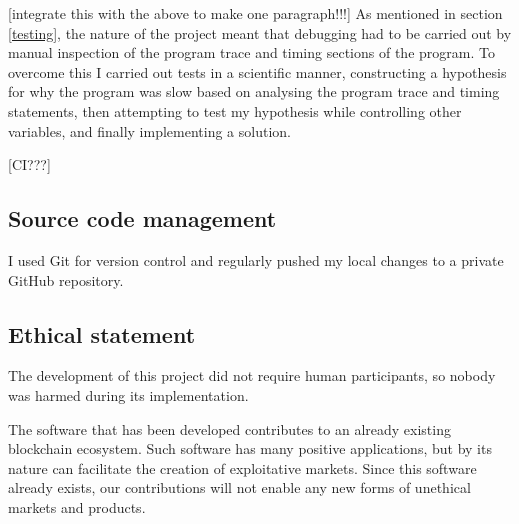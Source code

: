 [integrate this with the above to make one paragraph!!!]
As mentioned in section \ref{testing}, the nature of the project meant that debugging had to be carried out by manual inspection of the program trace and timing sections of the program. To overcome this I carried out tests in a scientific manner, constructing a hypothesis for why the program was slow based on analysing the program trace and timing statements, then attempting to test my hypothesis while controlling other variables, and finally implementing a solution.

[CI???]

\subsection{Source code management}

I used Git for version control and regularly pushed my local changes to a private GitHub repository.

\subsection{Ethical statement}
The development of this project did not require human participants, so nobody was harmed during its implementation.

The software that has been developed contributes to an already existing blockchain ecosystem. Such software has many positive applications, but by its nature can facilitate the creation of exploitative markets. Since this software already exists, our contributions will not enable any new forms of unethical markets and products.